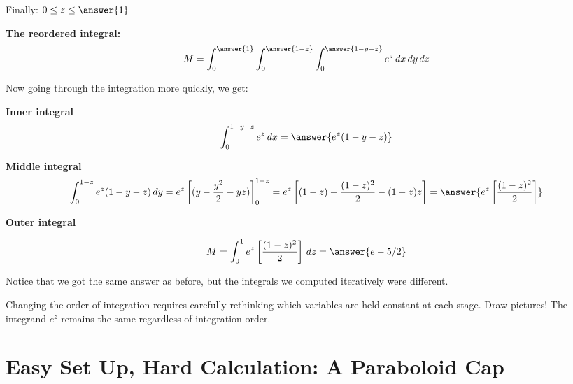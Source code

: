 \documentclass{ximera}
\begin{document}
\begin{problem}
\begin{center}
\end{center}

Finally: $0 \leq z \leq \answer{1}$

\textbf{The reordered integral:}
$$M = \int_0^{\answer{1}} \int_0^{\answer{1-z}} \int_0^{\answer{1-y-z}} e^{z}\,dx\,dy\,dz$$

Now going through the integration more quickly, we get:

\textbf{Inner integral}
$$\int_0^{1-y-z} e^{z}\,dx = \answer{e^{z}(1-y-z)}$$

\textbf{Middle integral}
$$\int_0^{1-z} e^{z}(1-y-z)\,dy = e^{z}\left[(y - \frac{y^2}{2} - yz)\right]_0^{1-z} = e^{z}\left[(1-z) - \frac{(1-z)^2}{2} - (1-z)z\right] = \answer{e^{z}\left[\frac{(1-z)^2}{2}\right]}$$

\textbf{Outer integral}

$$M = \int_0^1 e^{z}\left[\frac{(1-z)^2}{2}\right]\,dz =\answer{e-5/2}$$

Notice that we got the same answer as before, but the integrals we computed iteratively were different. 

\begin{feedback}
Changing the order of integration requires carefully rethinking which variables are held constant at each stage. Draw pictures! The integrand $e^{z}$ remains the same regardless of integration order.
\end{feedback}
\end{problem}

\section*{Easy Set Up, Hard Calculation: A Paraboloid Cap}
\end{document}
